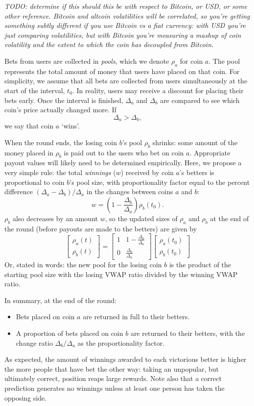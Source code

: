 \documentclass[floatfix,reprint,nofootinbib,amsmath,amssymb,epsfig,pre,floats,letterpaper,groupedaffiliation]{revtex4-1}
\newcommand{\beq}{\begin{equation}}
\newcommand{\eeq}{\end{equation}}
\begin{document}
\emph{TODO: determine if this should this be with respect to Bitcoin, or USD, or some other reference.  Bitcoin and altcoin volatilities will be correlated, so you're getting something subtly different if you use Bitcoin vs a fiat currency: with USD you're just comparing volatilities, but with Bitcoin you're measuring a mashup of coin volatility and the extent to which the coin has decoupled from Bitcoin.}

Bets from users are collected in \emph{pools}, which we denote $\rho_a$ for coin $a$.  The pool represents the total amount of money that users have placed on that coin.  For simplicity, we assume that all bets are collected from users simultaneously at the start of the interval, $t_0$.  In reality, users may receive a discount for placing their bets early.  Once the interval is finished, $\Delta_a$ and $\Delta_b$ are compared to see which coin's price actually changed more.  If
\beq
\Delta_{a} > \Delta_{b},
\eeq
we say that coin $a$ `wins'.

When the round ends, the losing coin $b$'s pool $\rho_b$ shrinks: some amount of the money placed in $\rho_b$ is paid out to the users who bet on coin $a$.  Appropriate payout values will likely need to be determined empirically.  Here, we propose a very simple rule: the total \emph{winnings} ($w$) received by coin $a$'s betters is proportional to coin $b$'s pool size, with proportionality factor equal to the percent difference $({\Delta_a - \Delta_b})/{\Delta_a}$ in the changes between coins $a$ and $b$:
\beq
w = \left(1-\frac{\Delta_b}{\Delta_a}\right) \rho_b(t_0).
\eeq
$\rho_b$ also decreases by an amount $w$, so the updated sizes of $\rho_a$ and $\rho_b$ at the end of the round (before payouts are made to the betters) are given by
\beq
\begin{bmatrix}
\rho_a(t)\\
\rho_b(t)
\end{bmatrix} =
\begin{bmatrix}
1 & 1-\frac{\Delta_b}{\Delta_a} \\
0 & \frac{\Delta_b}{\Delta_a}
\end{bmatrix}
\begin{bmatrix}
\rho_a(t_0)\\
\rho_b(t_0)
\end{bmatrix}
\eeq
Or, stated in words: the new pool for the losing coin $b$ is the product of the starting pool size with the losing VWAP ratio divided by the winning VWAP ratio.

In summary, at the end of the round:
\begin{itemize}
\item Bets placed on coin $a$ are returned in full to their betters.
\item A proportion of bets placed on coin $b$ are returned to their betters, with the change ratio $\Delta_b/\Delta_a$ as the proportionality factor.
\end{itemize}
As expected, the amount of winnings awarded to each victorious better is higher the more people that have bet the other way: taking an unpopular, but ultimately correct, position reaps large rewards.  Note also that a correct prediction generates no winnings unless at least one person has taken the opposing side.
\end{document}
